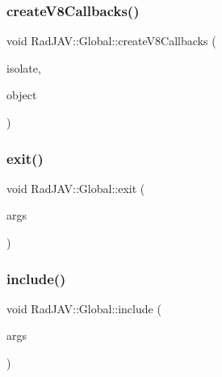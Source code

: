 \mbox{\label{class_rad_j_a_v_1_1_global_a5633a944f66dc6ca1ec8d92ab00e97b9}} 
\subsubsection{\texorpdfstring{create\+V8\+Callbacks()}{createV8Callbacks()}}
{\footnotesize\ttfamily void Rad\+J\+A\+V\+::\+Global\+::create\+V8\+Callbacks (\begin{DoxyParamCaption}\item[{v8\+::\+Isolate $\ast$}]{isolate,  }\item[{v8\+::\+Local$<$ v8\+::\+Object $>$}]{object }\end{DoxyParamCaption})\hspace{0.3cm}{\ttfamily [static]}}

\mbox{\label{class_rad_j_a_v_1_1_global_ac4bf5d57aa708dffac277280b07bc3f5}} 
\subsubsection{\texorpdfstring{exit()}{exit()}}
{\footnotesize\ttfamily void Rad\+J\+A\+V\+::\+Global\+::exit (\begin{DoxyParamCaption}\item[{const v8\+::\+Function\+Callback\+Info$<$ v8\+::\+Value $>$ \&}]{args }\end{DoxyParamCaption})\hspace{0.3cm}{\ttfamily [static]}}

\mbox{\label{class_rad_j_a_v_1_1_global_a0fb0b20f75e66da4ba021090ed8e74ea}} 
\subsubsection{\texorpdfstring{include()}{include()}}
{\footnotesize\ttfamily void Rad\+J\+A\+V\+::\+Global\+::include (\begin{DoxyParamCaption}\item[{const v8\+::\+Function\+Callback\+Info$<$ v8\+::\+Value $>$ \&}]{args }\end{DoxyParamCaption})\hspace{0.3cm}{\ttfamily [static]}}

